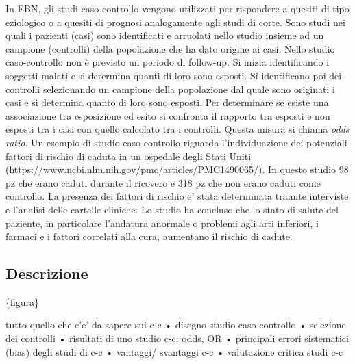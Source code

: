 \documentclass[]{book}
\begin{document}
In EBN, gli studi caso-controllo vengono utilizzati per rispondere a quesiti di tipo eziologico o a quesiti di prognosi analogamente agli studi di corte. Sono studi nei quali i pazienti (casi) sono identificati e arruolati nello studio insieme ad un campione (controlli) della popolazione che ha dato origine ai casi.
Nello studio caso-controllo non è previsto un periodo di follow-up. Si inizia identificando i soggetti malati e si determina quanti di loro sono esposti. Si identificano poi dei controlli selezionando un campione della popolazione dal quale sono originati i casi e si determina quanto di loro sono esposti. Per determinare se esiste una associazione tra esposizione ed esito si confronta il rapporto tra esposti e non esposti tra i casi con quello calcolato tra i controlli. Questa misura si chiama \emph{odds ratio}.
Un esempio di studio caso-controllo riguarda l'individuazione dei potenziali fattori di rischio di caduta in un ospedale degli Stati Uniti (\url{https://www.ncbi.nlm.nih.gov/pmc/articles/PMC1490065/}). In questo studio 98 pz che erano caduti durante il ricovero e 318 pz che non erano caduti come controllo. La presenza dei fattori di rischio e' stata determinata tramite interviste e l'analisi delle cartelle cliniche. Lo studio ha concluso che lo stato di salute del paziente, in particolare l'andatura anormale o problemi agli arti inferiori, i farmaci e i fattori correlati alla cura, aumentano il rischio di cadute.

\hypertarget{descrizione-2}{%
\subsection{Descrizione}\label{descrizione-2}}

\{figura\}

tutto quello che c'e' da sapere sui c-c
• disegno studio caso controllo
• selezione dei controlli
• risultati di uno studio c-c: odds, OR
• principali errori sistematici (bias) degli studi di c-c
• vantaggi/ svantaggi c-c
• valutazione critica studi c-c
\end{document}
